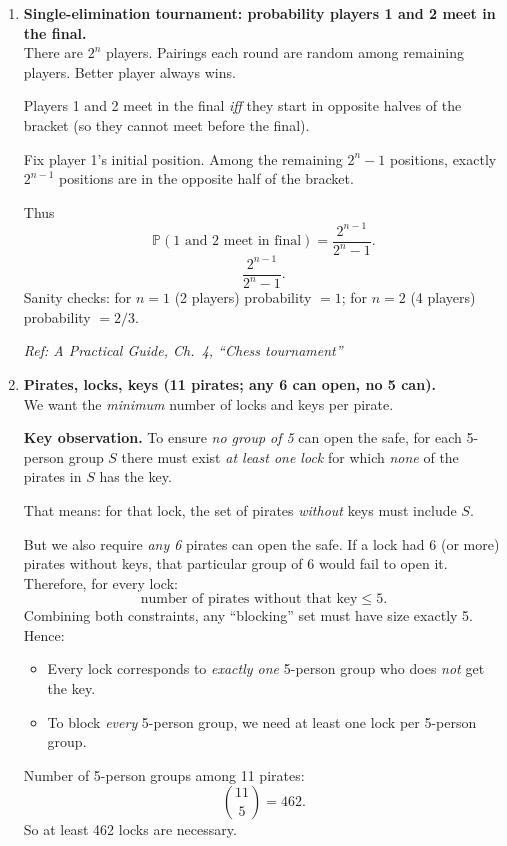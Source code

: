 \documentclass[11pt]{article}
\begin{document}
\begin{enumerate}[label=\textbf{\arabic*.}, resume]
\item \textbf{Single-elimination tournament: probability players 1 and 2 meet in the final.}\\
There are $2^n$ players. Pairings each round are random among remaining players. Better player always wins.

Players 1 and 2 meet in the final \emph{iff} they start in opposite halves of the bracket (so they cannot meet before the final).

Fix player 1's initial position. Among the remaining $2^n-1$ positions, exactly $2^{n-1}$ positions are in the opposite half of the bracket.

Thus
\[
\mathbb{P}(\text{1 and 2 meet in final})
=\frac{2^{n-1}}{2^n-1}.
\]
\[
\boxed{\frac{2^{n-1}}{2^n-1}.}
\]
Sanity checks: for $n=1$ (2 players) probability $=1$; for $n=2$ (4 players) probability $=2/3$.

\hfill{\small\textit{Ref: A Practical Guide, Ch.\ 4, ``Chess tournament''}}

\item \textbf{Pirates, locks, keys (11 pirates; any 6 can open, no 5 can).}\\
We want the \emph{minimum} number of locks and keys per pirate.

\medskip
\noindent\textbf{Key observation.}
To ensure \emph{no group of 5} can open the safe, for each 5-person group $S$ there must exist \emph{at least one lock} for which \emph{none} of the pirates in $S$ has the key.

That means: for that lock, the set of pirates \emph{without} keys must include $S$.

But we also require \emph{any 6} pirates can open the safe. If a lock had 6 (or more) pirates without keys, that particular group of 6 would fail to open it. Therefore, for every lock:
\[
\text{number of pirates without that key} \le 5.
\]
Combining both constraints, any ``blocking'' set must have size exactly 5. Hence:
\begin{itemize}
\item Every lock corresponds to \emph{exactly one} 5-person group who does \emph{not} get the key.
\item To block \emph{every} 5-person group, we need at least one lock per 5-person group.
\end{itemize}

Number of 5-person groups among 11 pirates:
\[
\binom{11}{5}=462.
\]
So at least 462 locks are necessary.


\end{enumerate}
\end{document}
